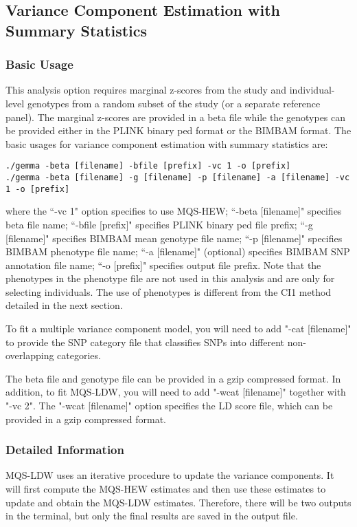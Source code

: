 \documentclass[11pt]{article}
\begin{document}
\subsection{Variance Component Estimation with Summary Statistics}
\subsubsection{Basic Usage}
This analysis option requires marginal z-scores from the study and individual-level genotypes from a random subset of the study (or a separate reference panel). The marginal z-scores are provided in a beta file while the genotypes can be provided either in the PLINK binary ped format or the BIMBAM format. The basic usages for variance component estimation with summary statistics are:
\begin{verbatim}
./gemma -beta [filename] -bfile [prefix] -vc 1 -o [prefix]
./gemma -beta [filename] -g [filename] -p [filename] -a [filename] -vc 1 -o [prefix]
\end{verbatim}
where the ``-vc 1" option specifies to use MQS-HEW; ``-beta [filename]" specifies beta file name; ``-bfile [prefix]" specifies PLINK binary ped file prefix; ``-g [filename]" specifies BIMBAM mean genotype file name; ``-p [filename]" specifies BIMBAM phenotype file name; ``-a [filename]" (optional) specifies BIMBAM SNP annotation file name; ``-o [prefix]" specifies output file prefix. Note that the phenotypes in the phenotype file are not used in this analysis and are only for selecting individuals. The use of phenotypes is different from the CI1 method detailed in the next section.

To fit a multiple variance component model, you will need to add "-cat [filename]" to provide the SNP category file that classifies SNPs into different non-overlapping categories. 

The beta file and genotype file can be provided in a gzip compressed format. In addition, to fit MQS-LDW, you will need to add "-wcat [filename]" together with "-vc 2". The "-wcat [filename]" option specifies the LD score file, which can be provided in a gzip compressed format.


\subsubsection{Detailed Information}
MQS-LDW uses an iterative procedure to update the variance components. It will first compute the MQS-HEW estimates and then use these estimates to update and obtain the MQS-LDW estimates. Therefore, there will be two outputs in the terminal, but only the final results are saved in the output file.
\end{document}
